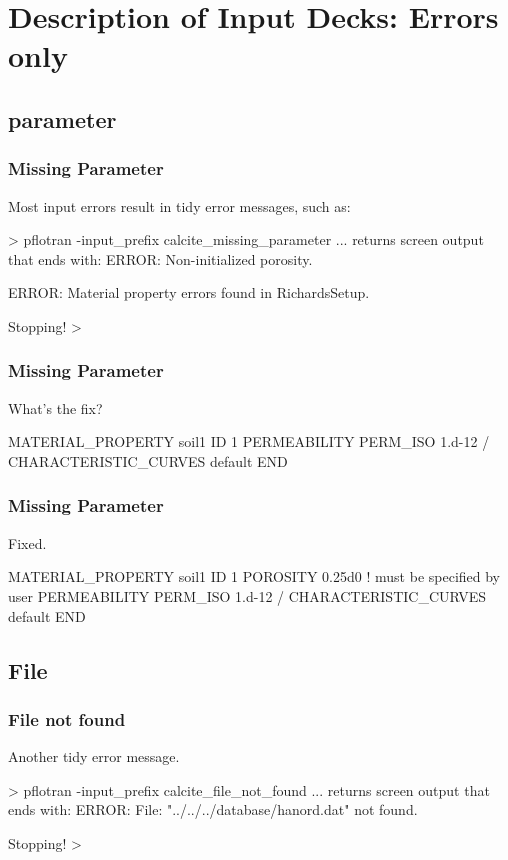 \documentclass{beamer}
\newcommand\gehcomment[1]{{{\color{orange} #1}}}
\newcommand\redcomment[1]{{{\color{red} #1}}}
\newcommand\bluecomment[1]{{{\color{blue} #1}}}
\newcommand\magentacomment[1]{{{\color{magenta} #1}}}
\begin{document}
\section{Description of Input Decks: Errors only }

\subsection{parameter}

\begin{frame}\frametitle{Missing Parameter}
Most input errors result in tidy error messages, such as:
\begin{semiverbatim}

> pflotran -input_prefix calcite_missing_parameter
... \gehcomment{returns screen output that ends with:}
  ERROR: Non-initialized porosity.

  ERROR: Material property errors found in RichardsSetup.

  Stopping!
>
\end{semiverbatim}

\end{frame}

\begin{frame}\frametitle{Missing Parameter}
\redcomment{What's the fix?}
\begin{semiverbatim}

MATERIAL_PROPERTY soil1
  ID 1
  PERMEABILITY
    PERM_ISO 1.d-12
  /
  CHARACTERISTIC_CURVES default
END
\end{semiverbatim}

\end{frame}

\begin{frame}\frametitle{Missing Parameter}
\redcomment{Fixed.}
\begin{semiverbatim}

MATERIAL_PROPERTY soil1
  ID 1
  \magentacomment{POROSITY 0.25d0} \bluecomment{! must be specified by user}
  PERMEABILITY
    PERM_ISO 1.d-12
  /
  CHARACTERISTIC_CURVES default
END
\end{semiverbatim}

\end{frame}

\subsection{File}
\begin{frame}\frametitle{File not found}
Another tidy error message.
\begin{semiverbatim}

> pflotran -input_prefix calcite_file_not_found
... \gehcomment{returns screen output that ends with:}
  ERROR: File: "../../../database/hanord.dat" not found.

  Stopping!
>
\end{semiverbatim}

\end{frame}
\end{document}
